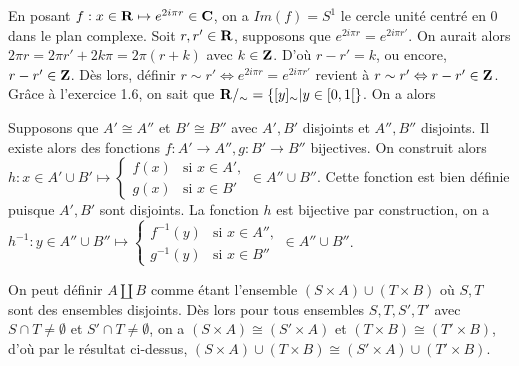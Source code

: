 \begin{exercice}
    En posant $f : x \in \mathbf{R} \mapsto e^{2i\pi r} \in \mathbf{C}$, on a $Im(f) = S^1$ le cercle unité centré en 0 dans le plan complexe.
    Soit $r, r' \in \mathbf{R}$, supposons que $e^{2i\pi r} = e^{2i\pi r'}$. On aurait alors $2\pi r = 2\pi r' + 2k\pi = 2\pi(r + k)$ avec $k \in \mathbf{Z}$.
    D'où $r - r' = k$, ou encore, $r - r' \in \mathbf{Z}$. Dès lors, définir $r \sim r' \Leftrightarrow e^{2i\pi r} = e^{2i\pi r'}$ revient à $r \sim r' \Leftrightarrow r - r' \in \mathbf{Z}$.
    Grâce à l'exercice 1.6, on sait que $\mathbf{R} /_\sim = \{[y]_\sim | y \in [0,1[\}$.
    On a alors 

    \begin{figure}[h]
        \centering
    \end{figure}
\end{exercice}

\begin{exercice}
    Supposons que $A' \cong A''$ et $B' \cong B''$ avec $A', B'$ disjoints et $A'', B''$ disjoints. Il existe alors des fonctions $f : A' \to A'', g : B' \to B''$
    bijectives. On construit alors $h : x \in A' \cup B' \mapsto 
    \begin{cases}
        f(x) & \text{si } x \in A', \\
        g(x) & \text{si } x \in B'
    \end{cases} \in A'' \cup B''$.
    Cette fonction est bien définie puisque $A', B'$ sont disjoints. La fonction $h$ est bijective par construction, on a 
    $h^{-1} : y \in A'' \cup B'' \mapsto 
    \begin{cases}
        f^{-1}(y) & \text{si } x \in A'', \\
        g^{-1}(y) & \text{si } x \in B''
    \end{cases} \in A'' \cup B''$.
    
    On peut définir $A \amalg B$ comme étant l'ensemble $(S \times A) \cup (T \times B)$ où $S, T$ sont des 
    ensembles disjoints. Dès lors pour tous ensembles $S, T, S', T'$ avec $S \cap T \neq \emptyset$ et $S' \cap T \neq \emptyset$, on a 
    $(S \times A) \cong (S' \times A)$ et $(T \times B) \cong (T' \times B)$, d'où par le résultat ci-dessus, $(S \times A) \cup (T \times B) \cong (S' \times A) \cup (T' \times B)$.
\end{exercice}

